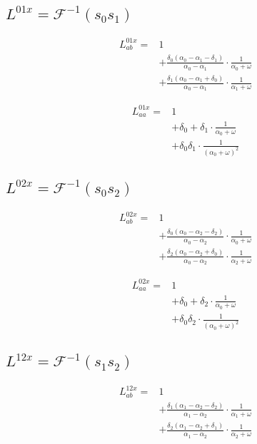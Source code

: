 \documentclass[a4paper,10pt]{article}
\begin{document}
\subsection{$L^{01x} = \mathcal{F}^{-1}(s_{0}s_{1})$}


\begin{align*}
 L^{01x}_{ab}  =&1\\
&+ \frac{\delta_{0} \left(\alpha_{0} - \alpha_{1} - \delta_{1}\right)}{\alpha_{0} - \alpha_{1}} \cdot \frac{1}{\alpha_{0} + \omega}\\
&+ \frac{\delta_{1} \left(\alpha_{0} - \alpha_{1} + \delta_{0}\right)}{\alpha_{0} - \alpha_{1}} \cdot \frac{1}{\alpha_{1} + \omega}
\end{align*}

\begin{align*}
 L^{01x}_{aa}  =&1\\
&+ \delta_{0} + \delta_{1} \cdot \frac{1}{\alpha_{0} + \omega}\\
&+ \delta_{0} \delta_{1} \cdot \frac{1}{\left(\alpha_{0} + \omega\right)^{2}}
\end{align*}
\subsection{$L^{02x} = \mathcal{F}^{-1}(s_{0}s_{2})$}


\begin{align*}
 L^{02x}_{ab}  =&1\\
&+ \frac{\delta_{0} \left(\alpha_{0} - \alpha_{2} - \delta_{2}\right)}{\alpha_{0} - \alpha_{2}} \cdot \frac{1}{\alpha_{0} + \omega}\\
&+ \frac{\delta_{2} \left(\alpha_{0} - \alpha_{2} + \delta_{0}\right)}{\alpha_{0} - \alpha_{2}} \cdot \frac{1}{\alpha_{2} + \omega}
\end{align*}

\begin{align*}
 L^{02x}_{aa}  =&1\\
&+ \delta_{0} + \delta_{2} \cdot \frac{1}{\alpha_{0} + \omega}\\
&+ \delta_{0} \delta_{2} \cdot \frac{1}{\left(\alpha_{0} + \omega\right)^{2}}
\end{align*}
\subsection{$L^{12x} = \mathcal{F}^{-1}(s_{1}s_{2})$}


\begin{align*}
 L^{12x}_{ab}  =&1\\
&+ \frac{\delta_{1} \left(\alpha_{1} - \alpha_{2} - \delta_{2}\right)}{\alpha_{1} - \alpha_{2}} \cdot \frac{1}{\alpha_{1} + \omega}\\
&+ \frac{\delta_{2} \left(\alpha_{1} - \alpha_{2} + \delta_{1}\right)}{\alpha_{1} - \alpha_{2}} \cdot \frac{1}{\alpha_{2} + \omega}
\end{align*}
\end{document}
